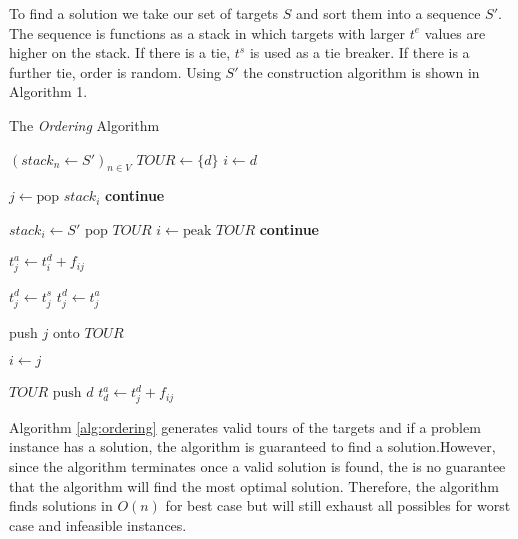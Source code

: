 \algnewcommand{}
\algnewcommand{}

To find a solution we take our set of targets $S$ and sort them into a sequence $S'$. The sequence is functions as a stack in which targets with larger $t^e$ values are higher on the stack. If there is a tie, $t^s$ is used as a tie breaker. If there is a further tie, order is random. Using $S'$ the construction algorithm is shown in Algorithm 1.

\begin{algorithm}
\caption{The \textit{Ordering} Algorithm}\label{alg:ordering}

\begin{algorithmic}[1]

\State $ (stack_n \gets S' )_{n\in V} $
\State $ TOUR \gets \{d\} $
\State $ i \gets d $


     
        \State $ j \gets \text{pop } stack_i $
            \State \textbf{continue} 
        \EndIf

    \Else
        \State $ stack_i \gets S' $ 
        \State pop $TOUR$
        \State $ i \gets \text{peak } TOUR $
        \State \textbf{continue} 
    \EndIf

    \State $ t^a_j \gets t^d_i + f_{ij} $ 

        \State $ t^d_j \gets t^s_j $ 
    \Else
        \State $ t^d_j \gets t^a_j $ 
    \EndIf

    \State push $j$ onto $TOUR$

    \State $ i \gets j $

\EndWhile

\State $ TOUR \text{ push } d $ 
\State $ t^a_d \gets t^d_j + f_{ij} $ 
\State {} 

\end{algorithmic}
\end{algorithm}

Algorithm \ref{alg:ordering} generates valid tours of the targets and if a problem instance has a solution, the algorithm is guaranteed to find a solution.However, since the algorithm terminates once a valid solution is found, the is no guarantee that the algorithm will find the most optimal solution. Therefore, the algorithm finds solutions in $O(n)$ for best case but will still exhaust all possibles for worst case and infeasible instances.


